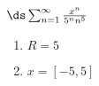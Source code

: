 {$\ds\sum_{n=1}^\infty \frac{x^n}{5^n n^5}$}
{\begin{enumerate}
	\item $R=5$
	\item $x=[-5,5]$
\end{enumerate}}